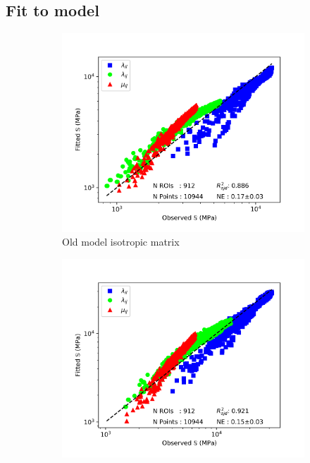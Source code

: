 \documentclass[a4paper,fleqn]{DC_ArtStyle}
\begin{document}
	\subsection{Fit to model}
	\begin{figure}
		\centering
		\begin{subfigure}[b]{0.45\linewidth}
			\includegraphics[width=\linewidth]{RegressionFabric_Isotropic}
			\caption{Old model isotropic matrix}
		\end{subfigure}
		\begin{subfigure}[b]{0.45\linewidth}
			\includegraphics[width=\linewidth]{RegressionFabric_Transverse}

\end{subfigure}
\end{figure}
\end{document}
